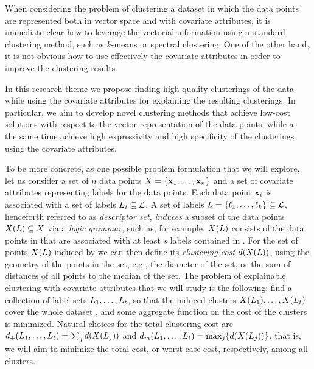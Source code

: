 \documentclass[a4paper,11pt]{article}
\begin{document}
When considering the problem of clustering a dataset in which the data points are 
represented both in vector space and with covariate attributes, 
it is immediate clear how to leverage the vectorial information
using a standard clustering method, such as $k$-means or spectral clustering. 
One of the other hand, it is not obvious how to use effectively the 
covariate attributes in order to improve the clustering results. 

In this research theme we propose finding high-quality clusterings of the data
while using the covariate attributes for explaining the resulting clusterings. 
In particular, we aim to develop novel clustering methods
that achieve low-cost solutions with respect to the vector-representation of the data points, 
while at the same time achieve high expressivity and high specificity of the clusterings
using the covariate attributes. 

To be more concrete, as one possible problem formulation that we will explore, 
let us consider a set of $n$ data points $X=\{\mathbf{x}_1,\ldots,\mathbf{x}_n\}$
and a set of covariate attributes {} representing labels for the data points. 
Each data point $\mathbf{x}_i$ is associated with a set of labels ${L}_i\subseteq\mathcal{L}$. 
A set of labels ${L}=\{{\ell}_1,\ldots,{\ell}_k\}\subseteq\mathcal{L}$, 
henceforth referred to as \emph{descriptor set}, 
\emph{induces} a subset of the data points $X({L})\subseteq X$
via a \emph{logic grammar}, such as, for example, 
$X({L})$ consists of the data points in \dataset that 
are associated with at least $s$ labels contained in .
For the set of points $X({L})$ induced by  
we can then define its \emph{clustering cost} $d(X({L}))$, 
using the geometry of the points in the set, 
e.g., the diameter of the set, or the sum of distances of all points to the median of the set.
The problem of explainable clustering with covariate attributes that we will study is the following: 
find a collection of label sets ${L}_1,\ldots,{L}_t$, 
so that the induced clusters $X({L}_1),\ldots,X({L}_t)$
cover the whole dataset \dataset, 
and some aggregate function on the cost of the clusters is minimized. 
Natural choices for the total clustering cost are
$d_{+}({L}_1,\ldots,{L}_t) = \sum_{j} d(X({L}_j))$ and 
$d_{m}({L}_1,\ldots,{L}_t) = \max_{j}\! \left\{ d(X({L}_j)) \right\}$, 
that is, we will aim to minimize the total cost, or worst-case cost, respectively, 
among all clusters. 
\end{document}
